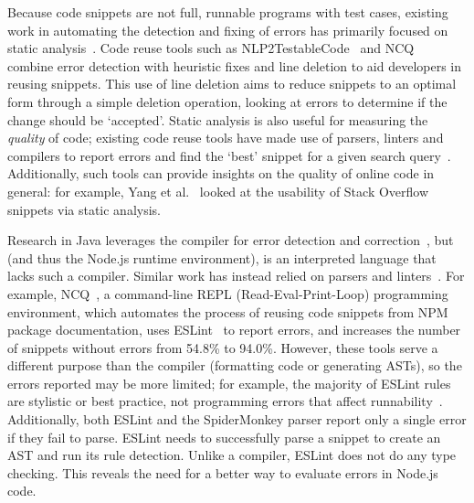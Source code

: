\documentclass[conference]{IEEEtran}
\begin{document}
Because code snippets are not full, runnable programs with test cases, existing work in automating the detection and fixing of errors has primarily focused on static analysis~\cite{reidnlp2tc, yang2016query, reidNCQ, campos2019mining, 10.1145/3520304.3528772, 10.1145/3520304.3533970}. Code reuse tools such as NLP2TestableCode~\cite{reidnlp2tc} and NCQ~\cite{reidNCQ} combine error detection with heuristic fixes and line deletion to aid developers in reusing snippets. This use of line deletion aims to reduce snippets to an optimal form through a simple deletion operation, looking at errors to determine if the change should be `accepted'. Static analysis is also useful for measuring the \textit{quality} of code; existing code reuse tools have made use of parsers, linters and compilers to report errors and find the `best' snippet for a given search query~\cite{reidnlp2tc, reidNCQ}. Additionally, such tools can provide insights on the quality of online code in general: for example, Yang et al.~\cite{yang2016query} looked at the usability of Stack Overflow snippets via static analysis. 

Research in Java leverages the compiler for error detection and correction~\cite{terragni2016csnippex, reidnlp2tc}, but \js (and thus the Node.js runtime environment), is an interpreted language that lacks such a compiler. Similar work has instead relied on parsers and linters~\cite{yang2016query, reidNCQ, campos2019mining}. For example, NCQ~\cite{reidNCQ}, a command-line REPL (Read-Eval-Print-Loop) programming environment, which automates the process of reusing code snippets from NPM package documentation, uses ESLint~\cite{eslint} to report errors, and increases the number of snippets without errors from 54.8\% to 94.0\%. However, these tools serve a different purpose than the compiler (formatting code or generating ASTs), so the errors reported may be more limited; for example, the majority of ESLint rules are stylistic or best practice, not programming errors that affect runnability~\cite{campos2019mining}. Additionally, both ESLint and the SpiderMonkey parser report only a single error if they fail to parse. ESLint needs to successfully parse a snippet to create an AST and run its rule detection. Unlike a compiler, ESLint does not do any type checking. This reveals the need for a better way to evaluate errors in Node.js code.
\end{document}
